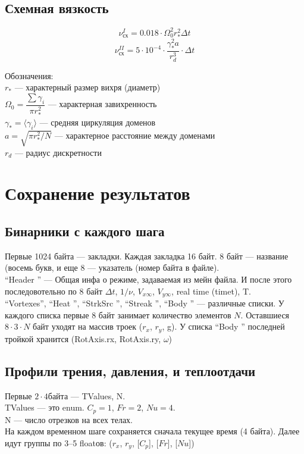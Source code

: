 \documentclass[14pt]{extreport}
\begin{document}
\subsection{Схемная вязкость}
\begin{equation*}
\nu_\text{сх}^I = 0.018 \cdot \Omega_0^2 r_*^2 \Delta t
\end{equation*}
\begin{equation*}
\nu_\text{сх}^{II} = 5\cdot10^{-4} \cdot \dfrac{\gamma_*^2 a}{r_d^3} \cdot \Delta t
\end{equation*}

Обозначения:\\
$r_*$ --- характерный размер вихря (диаметр)\\
$\Omega_0 = \dfrac{\sum\gamma_i}{\pi r_*^2}$ --- характерная завихренность\\
$\gamma_* = \langle \gamma_i \rangle$ --- средняя циркуляция доменов\\
$a = \sqrt{\pi r_*^2 / N} $ --- характерное расстояние между доменами\\
$r_d$ --- радиус дискретности\\

\newpage
\section{Сохранение результатов}

\subsection{Бинарники с каждого шага}
Первые 1024 байта --- закладки. Каждая закладка 16 байт. 8 байт --- название (восемь букв, и еще 8 --- указатель (номер байта в файле).\\
``Header  '' --- Общая инфа о режиме, задаваемая из мейн файла. И после этого последовотельно по 8 байт $\Delta t$, $1/\nu$, $V_{x\infty}$, $V_{y\infty}$, real time (timet), T.\\
``Vortexes'', ``Heat    '', ``StrkSrc '', ``Streak  '', ``Body    '' --- различные списки. У каждого списка первые 8 байт занимает количество элементов $N$. Оставшиеся $8\cdot 3 \cdot N$ байт уходят на массив троек ($r_x$, $r_y$, g). У списка ``Body    '' последней тройкой хранится (RotAxis.rx, RotAxis.ry, $\omega$)


\subsection{Профили трения, давления, и теплоотдачи}
Первые $2 \cdot 4$байта --- TValues, N.\\
TValues --- это enum. $C_p=1$, $Fr=2$, $Nu=4$.\\
N --- число отрезков на всех телах.\\
На каждом временном шаге сохраняется сначала текущее время (4 байта). Далее идут группы по 3--5 floatов: ($r_x$, $r_y$, [$C_p$], [$Fr$], [$Nu$])
\end{document}
